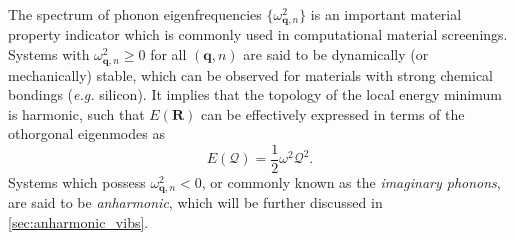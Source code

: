
The spectrum of phonon eigenfrequencies $\{\omega_{\bm{q},n}^2\}$ is an important material property indicator which is commonly used in computational material screenings. Systems with $\omega_{\bm{q},n}^2\geq 0$ for all $(\bm{q},n)$ are said to be dynamically (or mechanically) stable, which can be observed for materials with strong chemical bondings (\emph{e.g.} silicon). It implies that the topology of the local energy minimum is harmonic, such that $E(\bm{R})$ can be effectively expressed in terms of the othorgonal eigenmodes as
\begin{equation}\label{eq:PES_normal_mode_displaced}
    E(\mathcal{Q})=\frac{1}{2}\omega^2\mathcal{Q}^2.
\end{equation} Systems which possess  $\omega_{\bm{q},n}^2<0$, or commonly known as the \emph{imaginary phonons}, are said to be \emph{anharmonic}, which will be further discussed in \cref{sec:anharmonic_vibs}. 



